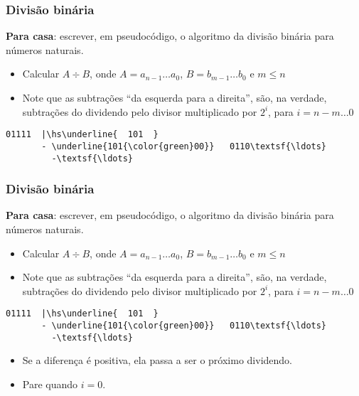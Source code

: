 \documentclass{beamer}
\begin{document}

\begin{frame}[fragile]
\frametitle{Divisão binária}

\textbf{Para casa}: escrever, em pseudocódigo, o algoritmo da divisão binária para números naturais.

\begin{itemize}
\item Calcular $A \div B$, onde $A = a_{n-1} \ldots a_0$, $B = b_{m-1} \ldots b_0$ e $m \le n$
\item Note que as subtrações ``da esquerda para a direita'', são, na verdade, subtrações do dividendo pelo divisor multiplicado por $2^i$, para $i = n-m \ldots 0$
\end{itemize}

\def\hs{\hspace{-1mm}}

\begin{Verbatim}[commandchars=\\\{\},codes={\catcode`$=3\catcode`^=7}]
         01111  |\hs\underline{  101  }
       - \underline{101{\color{green}00}}   0110\textsf{\ldots}
         -\textsf{\ldots}
\end{Verbatim}

\vspace{44pt}

\end{frame}


\begin{frame}[fragile]
\frametitle{Divisão binária}

\textbf{Para casa}: escrever, em pseudocódigo, o algoritmo da divisão binária para números naturais.

\begin{itemize}
\item Calcular $A \div B$, onde $A = a_{n-1} \ldots a_0$, $B = b_{m-1} \ldots b_0$ e $m \le n$
\item Note que as subtrações ``da esquerda para a direita'', são, na verdade, subtrações do dividendo pelo divisor multiplicado por $2^i$, para $i = n-m \ldots 0$
\end{itemize}

\def\hs{\hspace{-1mm}}

\begin{Verbatim}[commandchars=\\\{\},codes={\catcode`$=3\catcode`^=7}]
         01111  |\hs\underline{  101  }
       - \underline{101{\color{green}00}}   0110\textsf{\ldots}
         -\textsf{\ldots}
\end{Verbatim}

\begin{itemize}
\item Se a diferença é positiva, ela passa a ser o próximo dividendo.
\item Pare quando $i = 0$.
\end{itemize}

\end{frame}
\end{document}
